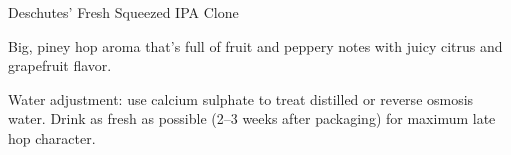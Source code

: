 \begin{recipe}{Deschutes' Fresh Squeezed IPA Clone}

\begin{aboutblock}
Big, piney hop aroma that's full of fruit and peppery notes with juicy citrus
and grapefruit flavor. \sourceaha
\end{aboutblock}


\begin{methodandtiming}
 
\begin{mashsteps}
\end{mashsteps}

\begin{fermentationsteps}
\end{fermentationsteps}

\begin{directions}
Water adjustment: use  calcium sulphate to treat distilled or
reverse osmosis water. Drink as fresh as possible (2--3 weeks after packaging)
for maximum late hop character.
\end{directions}

\end{methodandtiming}

\recipebreak

\begin{ingredientsblock}

\begin{malts}
\end{malts}

\begin{hops}

\end{hops}


\end{ingredientsblock}

\end{recipe}

